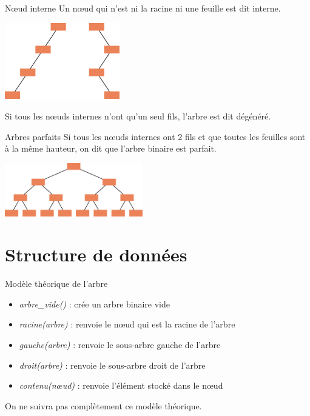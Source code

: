 \documentclass[10pt]{nsibeamer}
\begin{document}
\begin{frame}{N\oe ud interne}
Un n\oe ud qui n'est ni la racine ni une feuille est dit \alert{interne}.\pause
    \begin{center}
    \includegraphics[width=5cm]{img/peigne}
\end{center}
Si tous les n\oe uds internes n'ont qu'un seul fils, l'arbre est dit \alert{dégénéré}.
\end{frame}

\begin{frame}{Arbres parfaits}
    Si tous les n\oe uds internes ont 2 fils et que toutes les feuilles sont à la même hauteur, on dit que l'arbre binaire est \alert{parfait}.
    \begin{center}
        \includegraphics[width=6cm]{img/parfait}
    \end{center}
\end{frame}
\section{Structure de données}
\begin{frame}{Modèle théorique de l'arbre}
    \begin{itemize}
        \item \textit{arbre\_vide()} : crée un arbre binaire vide\pause
        \item \textit{racine(arbre)} : renvoie le n\oe ud qui est la racine de l'arbre\pause
        \item  \textit{gauche(arbre)} : renvoie le sous-arbre gauche de l'arbre\pause
        \item  \textit{droit(arbre)} : renvoie le sous-arbre droit de l'arbre\pause
        \item \textit{contenu(n\oe ud)} : renvoie l'élément stocké dans le n\oe ud\pause
    \end{itemize}
On ne suivra pas complètement ce modèle théorique.
\end{frame}
\end{document}
